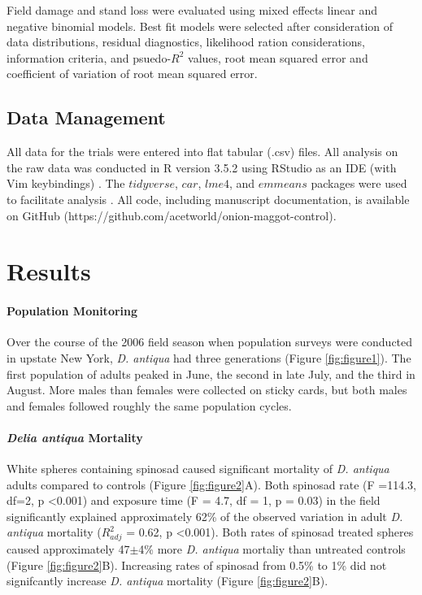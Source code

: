 \documentclass[num-refs]{wiley-article}
\begin{document}
Field damage and stand loss were evaluated using mixed effects linear and negative binomial models.  Best fit models were selected after consideration of data distributions, residual diagnostics, likelihood ration considerations, information criteria, and psuedo-$R^2$ values, root mean squared error and coefficient of variation of root mean squared error.  


\subsection{Data Management}

All data for the trials were entered into flat tabular (.csv) files.  All analysis on the raw data was conducted in R version 3.5.2 using RStudio as an IDE (with Vim keybindings) \citep{rcore2018,rstudio}.  The $tidyverse$, $car$, $lme4$, and $emmeans$ packages were used to facilitate analysis \citep{tidy, car, lme, emmeans}.  All code, including manuscript documentation, is available on GitHub (https://github.com/acetworld/onion-maggot-control).


\section{Results}

\paragraph{Population Monitoring}

Over the course of the 2006 field season when population surveys were conducted in upstate New York, \textit{D. antiqua} had three generations (Figure \ref{fig:figure1}).  The first population of adults peaked in June, the second in late July, and the third in August.  More males than females were collected on sticky cards, but both males and females followed roughly the same population cycles. 

\paragraph{\textit{Delia antiqua} Mortality}

White spheres containing spinosad caused significant mortality of \textit{D. antiqua} adults compared to controls (Figure \ref{fig:figure2}A).  Both spinosad rate (F =114.3, df=2, p \textless 0.001)  and exposure time (F = 4.7, df = 1, p = 0.03) in the field significantly explained approximately 62\% of the observed variation in adult \textit{D. antiqua} mortality ($R^2_{adj}$ = 0.62, p \textless 0.001).  Both rates of spinosad treated spheres caused approximately 47$\pm$4\% more \textit{D. antiqua} mortaliy than untreated controls (Figure \ref{fig:figure2}B).  Increasing rates of spinosad from 0.5\% to 1\% did not signifcantly increase \textit{D. antiqua} mortality (Figure \ref{fig:figure2}B).  
\end{document}
